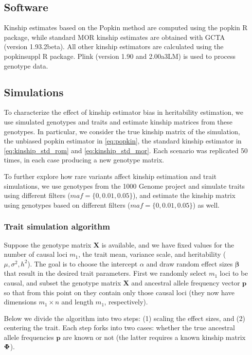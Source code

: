 \documentclass[11pt]{article}
\newcommand{\kinMat}{%
  \ensuremath{%
    \mathbf{\Phi}
  }%
  \xspace%
}%
\begin{document}
\subsection{Software}

Kinship estimates based on the Popkin method are computed using the popkin R package, while standard MOR kinship estimates are obtained with GCTA (version 1.93.2beta). All other kinship estimators are calculated using the popkinsuppl R package. Plink (version 1.90 and 2.00a3LM) is used to process genotype data.


\subsection{Simulations}
To characterize the effect of kinship estimator bias in heritability estimation, we use simulated genotypes and traits and estimate kinship matrices from these genotypes. In particular, we consider the true kinship matrix of the simulation, the unbiased popkin estimator in \cref{eq:popkin}, the standard
kinship estimator in \cref{eq:kinship_std_rom} and \cref{eq:kinship_std_mor}. Each scenario was replicated 50 times, in each case producing a new genotype matrix.

To further explore how rare variants affect kinship estimation and trait simulations, we use genotypes from the 1000 Genome project and simulate traits using different filters ($maf=\{0,0.01,0.05\}$), and estimate the kinship matrix using genotypes based on different filters ($maf=\{0,0.01,0.05\}$) as well. 

\subsubsection{Trait simulation algorithm}

Suppose the genotype matrix $\mathbf{X}$ is available, and we have fixed values for the number of causal loci $m_1$, the trait mean, variance scale, and heritability ($\mu, \sigma^2, h^2$).
The goal is to choose the intercept $\alpha$ and draw random effect sizes $\mathbf{\beta}$ that result in the desired trait parameters.
First we randomly select $m_1$ loci to be causal, and subset the genotype matrix $\mathbf{X}$ and ancestral allele frequency vector $\mathbf{p}$ so that from this point on they contain only those causal loci (they now have dimensions $m_1 \times n$ and length $m_1$, respectively).

Below we divide the algorithm into two steps: (1) scaling the effect sizes, and (2) centering the trait.
Each step forks into two cases: whether the true ancestral allele frequencies $\mathbf{p}$ are known or not (the latter requires a known kinship matrix $\kinMat$).
\end{document}
